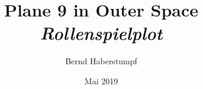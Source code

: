 \documentclass[helvetica,a4paper,11pt,german]{article}
\title{\Huge{}Plane 9 in Outer Space\\\smallskip\large\it{}Rollenspielplot}
\author{Bernd Haberstumpf}
\date{Mai 2019}
\begin{document}
\maketitle
\tableofcontents






\begin{appendices}
    
	
\end{appendices}
\end{document}
